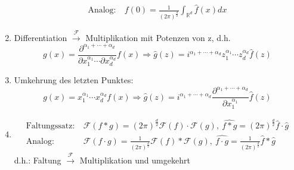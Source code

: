 \documentclass{article}
\theoremstyle{plain}
\theoremstyle{definition}
\numberwithin{equation}{section}
\newcommand{\R}[0] {
\mathbb R
}
\begin{document}
\begin{enumerate}[label = \roman *)]
\begin{align*}
            \text{Analog:} \ & \displaystyle f(0) = \frac{1}{(2 \pi )^\frac{d}{2}} \int_{\R^d} \hat f(x) dx
        \end{align*}
        \item Differentiation $\overset{\mathcal F}{\to}$ Multiplikation mit Potenzen von z, d.h.
        \begin{equation*}
            g(x) = \frac{\partial^{\alpha_1 + \cdots + \alpha_d}}{\partial x_1^{\alpha_1} \cdots \partial x_d^{\alpha_d}} f(x) \Rightarrow \hat g(z) = i^{\alpha_1 + \cdots + \alpha_d} z_1^{\alpha_1} \cdots z_d^{\alpha_d} \hat f(z)
        \end{equation*}
        \item Umkehrung des letzten Punktes:
        \begin{equation*}
            g(x) = x_1^{\alpha_1} \cdots x_d^{\alpha_d} f(x) \Rightarrow \hat g(z) = i^{\alpha_1 + \cdots + \alpha_d}  \frac{\partial^{\alpha_1 + \cdots + \alpha_d}}{\partial x_1^{\alpha_1}} \hat f(z)
        \end{equation*}
        \item
        \begin{align*}
            \text{Faltungssatz:} \  & \mathcal F(f*g) = (2 \pi)^{\frac{d}{2}} \mathcal F(f) \cdot \mathcal F(g), \ \widehat{f*g}=(2 \pi)^{\frac{d}{2}} \hat f \cdot \hat g\\
            \text{Analog:} \ & \mathcal F (f \cdot g) = \frac{1}{(2 \pi)^{\frac{d}{2}}} \mathcal F(f) * \mathcal F(g), \ \widehat{f \cdot g} = \frac{1}{(2\pi)^{\frac{d}{2}}} \hat f * \hat g
        \end{align*}
        d.h.: Faltung $\overset{\mathcal F}{\to}$ Multiplikation und umgekehrt
    \end{enumerate}
\end{document}

